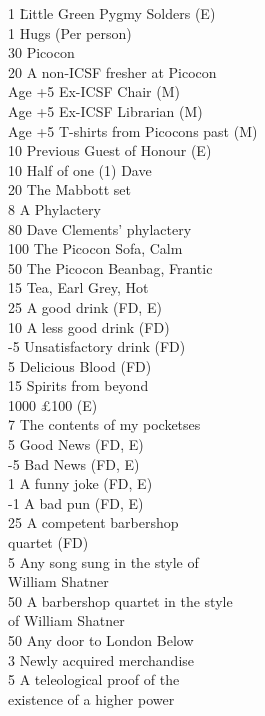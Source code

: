 \begin{multicols}{2}
	\begin{tabbing}
1 \hspace{12mm}	\= Little Green Pygmy Solders (E) \\
1	\> Hugs (Per person) \\
30	\> Picocon \\
20	\> A non-ICSF fresher at Picocon \\
Age +5	\> Ex-ICSF Chair (M) \\
Age +5	\> Ex-ICSF Librarian (M) \\
Age +5	\> T-shirts from Picocons past (M) \\
10 	\> Previous Guest of Honour (E) \\
10	\> Half of one (1) Dave \\
20	\> The Mabbott set \\
8	\> A Phylactery \\
80 	\> Dave Clements' phylactery \\
100	\> The Picocon Sofa, Calm \\
50	\> The Picocon Beanbag, Frantic \\
15	\> Tea, Earl Grey, Hot \\
25 	\> A good drink (FD, E) \\
10 	\> A less good drink (FD) \\
-5	\> Unsatisfactory drink (FD) \\
5	\> Delicious Blood (FD) \\
15	\> Spirits from beyond \\
1000 	\> £100 (E) \\
7	\> The contents of my pocketses \\
5	\> Good News (FD, E) \\
-5	\> Bad News (FD, E) \\
1	\> A funny joke (FD, E) \\
-1	\> A bad pun (FD, E) \\
25	\> A competent barbershop \\ \> quartet (FD) \\
5	\> Any song sung in the style of \\ \> William Shatner \\
50	\> A barbershop quartet in the style \\ \> of William Shatner \\
50 \> Any door to London Below \\
3   \> Newly acquired merchandise  \\
5   \> A teleological proof of the\\ \> existence of a higher power \\

\end{tabbing}
\end{multicols}
